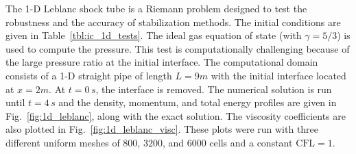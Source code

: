 \documentclass[review,10pt]{elsarticle}
\newcommand{\fig}[1]{Fig.~\ref{#1}}                      %
\newcommand{\tbl}[1]{Table~\ref{#1}}                     %
\begin{document}
The 1-D Leblanc shock tube is a Riemann problem designed to test the robustness and the accuracy of stabilization methods. 
The initial conditions are given in \tbl{tbl:ic_1d_tests}. The ideal gas equation of state (with $\gamma=5/3$) is used to 
compute the pressure.
This test is computationally challenging because of the large pressure ratio at the initial interface.
The computational domain consists of a 1-D straight pipe of length $L=9m$ with the initial interface located at $x=2m$. 
At $t=0\,s$, the interface is removed. The numerical solution is run until $t=4\,s$ and the density, momentum, and 
total energy profiles are given in \fig{fig:1d_leblanc}, along with the exact solution. The viscosity coefficients 
are also plotted in \fig{fig:1d_leblanc_visc}. These plots were run with three different uniform meshes of $800$, 
$3200$, and $6000$ cells and a constant $\text{CFL} = 1$.
\end{document}
